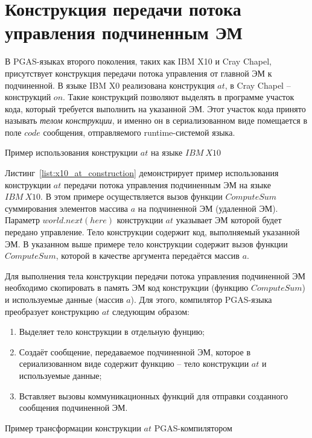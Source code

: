 \section{Конструкция передачи потока управления подчиненным ЭМ}

В PGAS-языках второго поколения, таких как IBM X10 и Cray Chapel, присутствует конструкция передачи потока управления от главной ЭМ к подчиненной. В языке
IBM X0 реализована конструкция $at$, в Cray Chapel -- конструкций $on$. Такие
конструкций позволяют выделять в программе участок кода, который требуется
выполнить на указанной ЭМ. Этот участок кода принято называть \textit{телом конструкции}, и именно он в сериализованном виде помещается в поле $code$ сообщения, отправляемого runtime-системой языка.

\begin{ListingEnv}[ht]
	
    \caption{Пример использования конструкции $at$ на языке $IBM\ X10$}
    \label{list:x10_at_construction}
\end{ListingEnv}

Листинг~\ref{list:x10_at_construction} демонстрирует пример использования
конструкции $at$ передачи потока управления подчиненным ЭМ на языке $IBM\ X10$.
В этом примере осуществляется вызов функции $ComputeSum$ суммирования элементов
массива $a$ на подчиненной ЭМ (удаленной ЭМ). Параметр $world.next(here)$
конструкции $at$ указывает ЭМ которой будет передано управление. Тело
конструкции содержит код, выполняемый указанной ЭМ. В указанном выше примере
тело конструкции содержит вызов функции $ComputeSum$, которой в качестве
аргумента передаётся массив $a$.

Для выполнения тела конструкции передачи потока управления подчиненной ЭМ
необходимо скопировать в память ЭМ код конструкции (функцию $ComputeSum$)
и используемые данные (массив $a$). Для этого, компилятор PGAS-языка преобразует
конструкцию $at$ следующим образом:
\begin{enumerate}
\item Выделяет тело конструкции в отдельную фунцию;
\item Создаёт сообщение, передаваемое подчиненной ЭМ, которое в сериализованном
  виде содержит функцию -- тело конструкции $at$ и используемые данные;
\item Вставляет вызовы коммуникационных функций для отправки созданного
  сообщения подчиненной ЭМ.
\end{enumerate}

\begin{ListingEnv}[ht]
	
    \caption{Пример трансформации конструкции $at$ PGAS-компилятором}
    \label{list:x10_intermediate_at_construction}
\end{ListingEnv}

